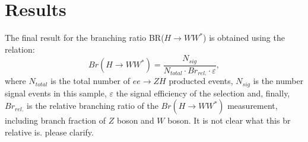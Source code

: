 \documentclass[11pt,a4paper]{cepcnote}
\begin{document}
%
%



%
%


%
%
\section{Results}
The final result for the branching ratio BR($H\rightarrow WW^*$) is 
obtained using the relation: 
\begin{equation*}
Br(H\rightarrow WW^*) = \frac{N_{sig}}{N_{total} \cdot Br_{rel.} \cdot \varepsilon},
\end{equation*}
where $N_{total}$ is the total number of $ee\to ZH$ producted events,
$N_{sig}$ is the number signal events in this sample, $\varepsilon$ the
signal efficiency of the selection and, finally, $Br_{rel.}$ is the
relative branching ratio  of the $Br(H\rightarrow WW^*)$ measurement, including branch fraction of $Z$ boson and $W$ boson.
{\color{red}It is not clear what this br relative is. please clarify}.
\end{document}
